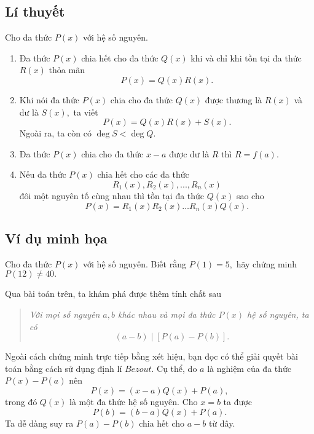 \subsection*{Lí thuyết}

Cho đa thức $P(x)$ với hệ số nguyên.
\begin{enumerate}
    \item Đa thức $P(x)$ chia hết cho đa thức $Q(x)$ khi và chỉ khi tồn tại đa thức $R(x)$ thỏa mãn
    $$P(x)=Q(x)R(x).$$
    \item Khi nói đa thức $P(x)$ chia cho đa thức $Q(x)$ được thương là $R(x)$ và dư là $S(x),$ ta viết
    $$P(x)=Q(x)R(x)+S(x).$$  
    Ngoài ra, ta còn có $\deg S<\deg Q.$
    \item {} Đa thức $P(x)$ chia cho đa thức $x-a$ được dư là $R$ thì $R=f(a).$
    \item Nếu đa thức $P(x)$ chia hết cho các đa thức $$R_1(x),R_2(x),...,R_n(x)$$ đôi một nguyên tố cùng nhau thì tồn tại đa thức $Q(x)$ sao cho
        $$P(x)=R_1(x)R_2(x)\ldots R_n(x)Q(x).$$
\end{enumerate}

\subsection*{Ví dụ minh họa}
\begin{bx}
Cho đa thức $P(x)$ với hệ số nguyên. Biết rằng $P(1)=5,$ hãy chứng minh $P(12)\ne 40.$
\begin{luuy}
Qua bài toán trên, ta khám phá được thêm tính chất sau
\begin{quote}
\it
    Với mọi số nguyên $a,b$ khác nhau và mọi đa thức $P(x)$ hệ số nguyên, ta có
    $$(a-b)\mid \left[P(a)-P(b)\right].$$
\end{quote}
Ngoài cách chứng minh trực tiếp bằng xét hiệu, bạn đọc có thể giải quyết bài toán bằng cách sử dụng định lí $Bezout$. Cụ thể, do $a$ là nghiệm của đa thức $P(x)-P(a)$ nên
$$P(x)=(x-a)Q(x)+P(a),$$
trong đó $Q(x)$ là một đa thức hệ số nguyên. Cho $x=b$ ta được
$$P(b)=(b-a)Q(x)+P(a).$$
Ta dễ dàng suy ra $P(a)-P(b)$ chia hết cho $a-b$ từ đây.
\end{luuy}
\end{bx}

